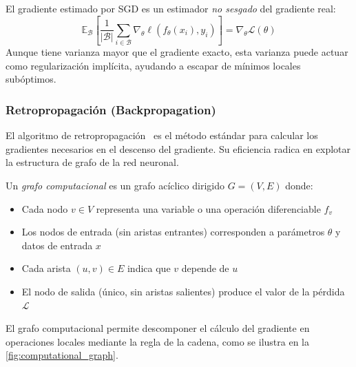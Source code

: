 El gradiente estimado por \gls{SGD} es un estimador \textit{no sesgado} del gradiente real:
\[
	\mathbb{E}_{\mathcal{B}}\left[\frac{1}{|\mathcal{B}|}\sum_{i \in \mathcal{B}} \nabla_\theta \ell(f_\theta(x_i), y_i)\right] = \nabla_\theta \mathcal{L}(\theta)
\]
Aunque tiene varianza mayor que el gradiente exacto, esta varianza puede actuar como regularización implícita, ayudando a escapar de mínimos locales subóptimos.

\subsubsection{Retropropagación (Backpropagation)}\label{subsubsec:backpropagation}

El algoritmo de retropropagación~\citep{backpropagation} es el método estándar para calcular los gradientes necesarios en el descenso del gradiente. Su eficiencia radica en explotar la estructura de grafo de la red neuronal.

\begin{definition}\label{def:computational_graph}
	Un \textit{grafo computacional} es un grafo acíclico dirigido \(G = (V, E)\) donde:
	\begin{itemize}
		\item Cada nodo \(v \in V\) representa una variable o una operación diferenciable \(f_v\)
		\item Los nodos de entrada (sin aristas entrantes) corresponden a parámetros \(\theta\) y datos de entrada \(x\)
		\item Cada arista \((u, v) \in E\) indica que \(v\) depende de \(u\)
		\item El nodo de salida (único, sin aristas salientes) produce el valor de la pérdida \(\mathcal{L}\)
	\end{itemize}
\end{definition}

El grafo computacional permite descomponer el cálculo del gradiente en operaciones locales mediante la regla de la cadena, como se ilustra en la \autoref{fig:computational_graph}.

